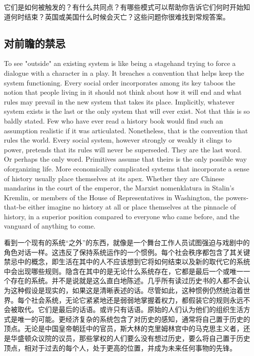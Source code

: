 \begin{Parallel}{97mm}{72mm}
  \ParallelRText
  {它们是如何被触发的？有什么共同点？有哪些模式可以帮助你告诉它们何时开始知道何时结束？英国或美国什么时候会灭亡？这些问题你很难找到常规答案。}

 \ParallelPar  

\subsection{对前瞻的禁忌}

  \ParallelLText
  {To see "outside" an existing system is like being a stagehand trying to force a dialogue with a character in a play. It breaches a convention that helps keep the system functioning. Every social order incorporates among its key taboos the notion that people living in it should not think about how it will end and what rules may prevail in the new system that takes its place. Implicitly, whatever system exists is the last or the only system that will ever exist. Not that this is so baldly stated. Few who have ever read a history book would find such an assumption realistic if it was articulated. Nonetheless, that is the convention that rules the world. Every social system, however strongly or weakly it clings to power, pretends that its rules will never be superseded. They are the last word. Or perhaps the only word. Primitives assume that theirs is the only possible way oforganizing life. More economically complicated systems that incorporate a sense of history usually place themselves at its apex. Whether they are Chinese mandarins in the court of the emperor, the Marxist nomenklatura in Stalin's Kremlin, or members of the House of Representatives in Washington, the powers-that-be either imagine no history at all or place themselves at the pinnacle of history, in a superior position compared to everyone who came before, and the vanguard of anything to come.}
  
  \ParallelRText
  {看到一个现有的系统“之外”的东西，就像是一个舞台工作人员试图强迫与戏剧中的角色对话一样。这违反了保持系统运作的一个惯例。每个社会秩序都包含了其关键禁忌中的概念，即生活在其中的人不应该想到它将如何结束以及新的取代它的系统中会出现哪些规则。隐含在其中的是无论什么系统存在，它都是最后一个或唯一一个存在的系统。并不是说就是这么直白地陈述。几乎所有读过历史书的人都不会认为这种假设是现实的，如果这是清晰表述的话。尽管如此，这种惯例仍然统治着世界。每个社会系统，无论它紧紧地还是弱弱地掌握着权力，都假装它的规则永远不会被取代。它们是最后的话语。或许只有话语。原始的人们认为他们的组织生活方式是唯一的可能。更经济复杂的系统包含了对历史的感知，通常将自己置于历史的顶点。无论是中国皇帝朝廷中的官员，斯大林的克里姆林宫中的马克思主义者，还是华盛顿众议院的议员，那些掌权的人们要么没有想过历史，要么将自己置于历史顶点，相对于过去的每个人，处于更高的位置，并成为未来任何事物的先锋。}
  \ParallelPar 


\end{Parallel}
